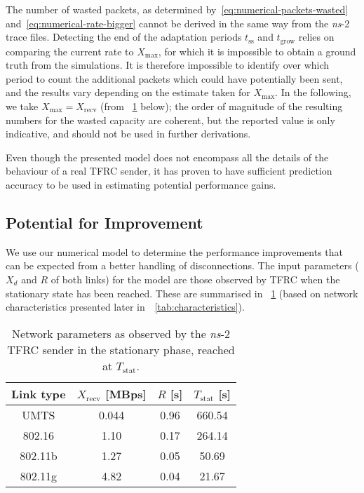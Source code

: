 \documentclass[twocolumn]{nictatechreport}
\newcommand{\ns}{\textit{ns}}
\begin{document}
The number of wasted packets, as determined
by~\eqref{eq:numerical-packets-wasted} and~\eqref{eq:numerical-rate-bigger}
cannot be derived in the same way from the \ns-2 trace files. Detecting the end
of the adaptation periods $t_\mathrm{ss}$ and $t_\mathrm{grow}$ relies on
comparing the current rate to $X_\mathrm{max}$, for which it is impossible to
obtain a ground truth from the simulations. It is therefore impossible to
identify over which period to count the additional packets which could have
potentially been sent, and the results vary depending on the estimate taken for
$X_\mathrm{max}$. In the following, we take $X_\mathrm{max} = X_\mathrm{recv}$
(from \tablename~\ref{tab:stationary-params} below); the order of magnitude of the
resulting numbers for the wasted capacity are coherent, but the reported value
is only indicative, and should not be used in further derivations.

Even though the presented model does not encompass all the details of the
behaviour of a real TFRC sender, it has proven to have sufficient prediction
accuracy to be used in estimating potential performance gains.

\subsection{Potential for Improvement}

We use our numerical model to determine the performance improvements that can be
expected from a better handling of disconnections. The input parameters ($X_d$
and $R$ of both links) for the model are those observed by TFRC when the
stationary state has been reached. These are summarised in
\tablename~\ref{tab:stationary-params} (based on network characteristics
presented later in~\tablename~\ref{tab:characteristics}). 

\begin{table}[tb]
  \centering
  \caption[Network parameters as observed by the \textit{ns}-2 TFRC sender]{Network
  parameters as observed by the \ns-2 TFRC sender in the stationary phase,
  reached at $T_\mathrm{stat}$.}
  \label{tab:stationary-params}
  \begin{tabular}{cccc}
    \toprule
    \textbf{Link type} & \textbf{$X_\mathrm{recv}$ [MBps]} & \textbf{$R$ [s]} & \textbf{$T_\mathrm{stat}$ [s]} \\
    \midrule
    UMTS & 	0.044 & 	0.96 & 	660.54 \\
    802.16 & 	1.10 & 	0.17 & 	264.14 \\
    802.11b & 	1.27 & 	0.05 & 	50.69 \\
    802.11g & 	4.82 & 	0.04 & 	21.67 \\
    \bottomrule
  \end{tabular}
\end{table}
\end{document}
